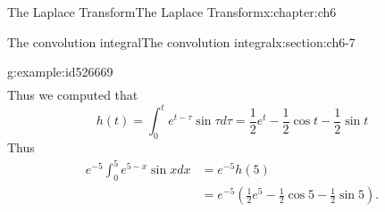 \documentclass[oneside,10pt,]{book}
\numberwithin{equation}{section}
\numberwithin{equation}{section}
\newcommand{\amp}{&}
\begin{document}
\begin{chapterptx}{The Laplace Transform}{}{The Laplace Transform}{}{}{x:chapter:ch6}
\begin{sectionptx}{The convolution integral}{}{The convolution integral}{}{}{x:section:ch6-7}
\begin{example}{}{g:example:id526669}
\begin{align*}
\end{align*}
Thus we computed that%
\begin{equation*}
h(t)=\int_{0}^{t}e^{t-\tau}\sin\tau d\tau=\frac{1}{2}e^{t}-\frac{1}{2}\cos t-\frac{1}{2}\sin t
\end{equation*}
Thus%
\begin{align*}
e^{-5}\int_{0}^{5}e^{5-x}\sin xdx \amp =e^{-5}h(5)\\
\amp =e^{-5}\left(\frac{1}{2}e^{5}-\frac{1}{2}\cos5-\frac{1}{2}\sin5\right).
\end{align*}
%
\end{example}
\end{sectionptx}
\end{chapterptx}
%
%
\typeout{************************************************}
\typeout{************************************************}
%
\end{document}
